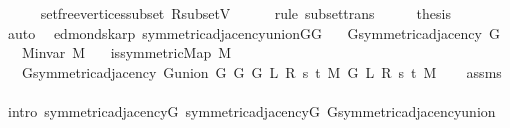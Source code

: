 \begin{isabellebody}
\ \ \ \ \isamarkupfalse%
\ set{\isacharunderscore}{\kern0pt}free{\isacharunderscore}{\kern0pt}vertices{\isacharunderscore}{\kern0pt}subset\ R{\isacharunderscore}{\kern0pt}subset{\isacharunderscore}{\kern0pt}V\isanewline
\ \ \ \ \isamarkupfalse%
\ {\isacharparenleft}{\kern0pt}rule\ subset{\isacharunderscore}{\kern0pt}trans{\isacharparenright}{\kern0pt}\isanewline
\ \ \isamarkupfalse%
\ \isamarkupfalse%
\ {\isacharquery}{\kern0pt}thesis\isanewline
\ \ \ \ \isamarkupfalse%
\ auto\isanewline
{}\isamarkupfalse%
%
\endisatagproof
{\isafoldproof}%
%
\isadelimproof
\isanewline
%
\endisadelimproof
%
\isadeliminvisible
\isanewline
%
\endisadeliminvisible
%
\isataginvisible
{}\isamarkupfalse%
\ {\isacharparenleft}{\kern0pt}\ edmonds{\isacharunderscore}{\kern0pt}karp{\isacharparenright}{\kern0pt}\ symmetric{\isacharunderscore}{\kern0pt}adjacency{\isacharunderscore}{\kern0pt}union{\isacharunderscore}{\kern0pt}G{}{\isacharunderscore}{\kern0pt}G{}{\isacharcolon}{\kern0pt}\isanewline
\ \ \ {\isachardoublequoteopen}G{\isachardot}{\kern0pt}symmetric{\isacharunderscore}{\kern0pt}adjacency{\isacharprime}{\kern0pt}\ G{\isachardoublequoteclose}\isanewline
\ \ \ {\isachardoublequoteopen}M{\isachardot}{\kern0pt}invar\ M{\isachardoublequoteclose}\isanewline
\ \ \ {\isachardoublequoteopen}is{\isacharunderscore}{\kern0pt}symmetric{\isacharunderscore}{\kern0pt}Map\ M{\isachardoublequoteclose}\isanewline
\ \ \ {\isachardoublequoteopen}G{\isachardot}{\kern0pt}symmetric{\isacharunderscore}{\kern0pt}adjacency{\isacharprime}{\kern0pt}\ {\isacharparenleft}{\kern0pt}G{\isachardot}{\kern0pt}union\ {\isacharparenleft}{\kern0pt}G{}\ G\ {\isacharparenleft}{\kern0pt}G{}\ L\ R\ s\ t\ M{\isacharparenright}{\kern0pt}{\isacharparenright}{\kern0pt}\ {\isacharparenleft}{\kern0pt}G{}\ L\ R\ s\ t\ M{\isacharparenright}{\kern0pt}{\isacharparenright}{\kern0pt}{\isachardoublequoteclose}%
\endisataginvisible
{\isafoldinvisible}%
%
\isadeliminvisible
\isanewline
%
\endisadeliminvisible
%
\isadelimproof
\ \ %
\endisadelimproof
%
\isatagproof
{}\isamarkupfalse%
\ assms\isanewline
\ \ \isamarkupfalse%
\ {\isacharparenleft}{\kern0pt}intro\ symmetric{\isacharunderscore}{\kern0pt}adjacency{\isacharunderscore}{\kern0pt}G{}\ symmetric{\isacharunderscore}{\kern0pt}adjacency{\isacharunderscore}{\kern0pt}G{}\ G{\isachardot}{\kern0pt}symmetric{\isacharunderscore}{\kern0pt}adjacency{\isacharunderscore}{\kern0pt}union{\isacharparenright}{\kern0pt}%

\end{isabellebody}
